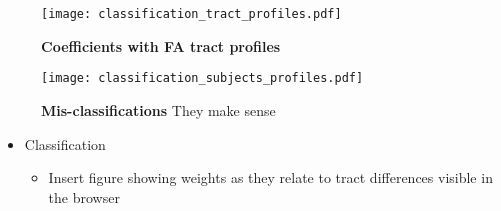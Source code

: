 \begin{figure}[!h]
    \centering
    \texttt{[image: classification\_tract\_profiles.pdf]}
    \caption{{\bf Coefficients with FA tract profiles}
       }
    \label{fig:class-profiles}
\end{figure}


\begin{figure}[!h]
    \centering
    \texttt{[image: classification\_subjects\_profiles.pdf]}
    \caption{{\bf Mis-classifications}
       They make sense}
    \label{fig:class-errors}
\end{figure}


\begin{itemize}
  \item Classification
    \begin{itemize}
      \item Insert figure showing weights as they relate to tract differences visible in the browser
    \end{itemize}
\end{itemize}

